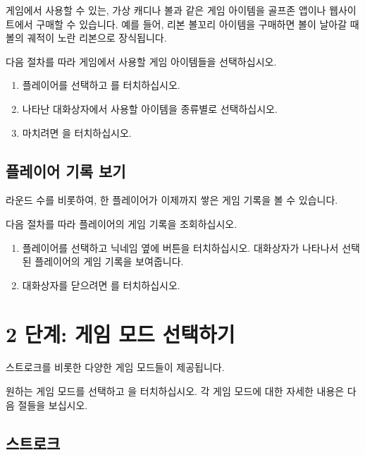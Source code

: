 \documentclass[10pt, openright, language=korean]{hzguide}
\begin{document}
게임에서 사용할 수 있는, 가상 캐디나 볼과 같은 게임 아이템을 골프존 앱이나 웹사이트에서 구매할 수 있습니다.
예를 들어, 리본 볼꼬리 아이템을 구매하면 볼이 날아갈 때 볼의 궤적이 노란 리본으로 장식됩니다.


다음 절차를 따라 게임에서 사용할 게임 아이템들을 선택하십시오.

\begin{enumerate}
\item 플레이어를 선택하고 를 터치하십시오.
\item 나타난 대화상자에서 사용할 아이템을 종류별로 선택하십시오.
\item 마치려면 을 터치하십시오.
\end{enumerate}

\subsection{플레이어 기록 보기}

라운드 수를 비롯하여, 한 플레이어가 이제까지 쌓은 게임 기록을 볼 수 있습니다.


다음 절차를 따라 플레이어의 게임 기록을 조회하십시오.

\begin{enumerate}
\item 플레이어를 선택하고 닉네임 옆에  버튼을 터치하십시오.
대화상자가 나타나서 선택된 플레이어의 게임 기록을 보여줍니다.
\item 대화상자를 닫으려면 를 터치하십시오.
\end{enumerate}

\newpage
\section{2 단계: 게임 모드 선택하기}
\label{sec:game_modes}

스트로크를 비롯한 다양한 게임 모드들이 제공됩니다.



원하는 게임 모드를 선택하고 을 터치하십시오.
각 게임 모드에 대한 자세한 내용은 다음 절들을 보십시오.

\subsection{스트로크}
\end{document}
